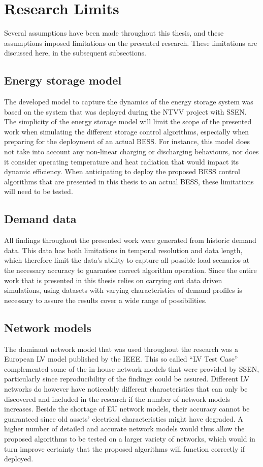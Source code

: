 \section{Research Limits}
\label{ch-conclusion:research-limits}

Several assumptions have been made throughout this thesis, and these assumptions imposed limitations on the presented research.
These limitations are discussed here, in the subsequent subsections.

\subsection{Energy storage model}

The developed model to capture the dynamics of the energy storage system was based on the system that was deployed during the NTVV project with SSEN.
The simplicity of the energy storage model will limit the scope of the presented work when simulating the different storage control algorithms, especially when preparing for the deployment of an actual BESS.
For instance, this model does not take into account any non-linear charging or discharging behaviours, nor does it consider operating temperature and heat radiation that would impact its dynamic efficiency.
When anticipating to deploy the proposed BESS control algorithms that are presented in this thesis to an actual BESS, these limitations will need to be tested.

\subsection{Demand data}

All findings throughout the presented work were generated from historic demand data.
This data has both limitations in temporal resolution and data length, which therefore limit the data's ability to capture all possible load scenarios at the necessary accuracy to guarantee correct algorithm operation.
Since the entire work that is presented in this thesis relies on carrying out data driven simulations, using datasets with varying characteristics of demand profiles is necessary to assure the results cover a wide range of possibilities.

\subsection{Network models}

The dominant network model that was used throughout the research was a European LV model published by the IEEE.
This so called ``LV Test Case'' complemented some of the in-house network models that were provided by SSEN, particularly since reproducibility of the findings could be assured.
Different LV networks do however have noticeably different characteristics that can only be discovered and included in the research if the number of network models increases.
Beside the shortage of EU network models, their accuracy cannot be guaranteed since old assets' electrical characteristics might have degraded.
A higher number of detailed and accurate network models would thus allow the proposed algorithms to be tested on a larger variety of networks, which would in turn improve certainty that the proposed algorithms will function correctly if deployed.
